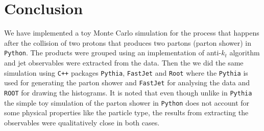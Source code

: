 \chapter{Conclusion}

We have implemented a toy Monte Carlo simulation for the process that happens after the collision of two protons that produces two partons (parton shower) in \verb+Python+. The products were grouped using an implementation of anti-$k_t$ algorithm and jet observables were extracted from the data. Then the we did the same simulation using \verb!C++! packages \verb+Pythia+, \verb+FastJet+ and \verb+Root+ where the \verb+Pythia+ is used for generating the parton shower and \verb+FastJet+ for analysing the data and \verb+ROOT+ for drawing the histograms. It is noted that even though unlike in \verb+Pythia+ the simple toy simulation of the parton shower in \verb+Python+ does not account for some physical properties like the particle type, the results from extracting the observables were qualitatively close in both cases.      